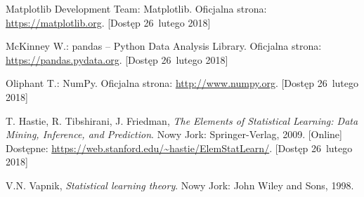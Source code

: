 \documentclass[11pt,a4paper]{article}
\begin{document}
\begin{thebibliography}{9}

        Matplotlib Development Team:
        Matplotlib.
        Oficjalna strona: \url{https://matplotlib.org}.
        [Dostęp 26~lutego 2018]

        McKinney W.:
        pandas -- Python Data Analysis Library.
        Oficjalna strona: \url{https://pandas.pydata.org}.
        [Dostęp 26~lutego 2018]

        Oliphant T.:
        NumPy.
        Oficjalna strona: \url{http://www.numpy.org}.
        [Dostęp 26~lutego 2018]

        T. Hastie,
        R. Tibshirani,
        J. Friedman,
        \emph{The Elements of Statistical Learning: Data Mining, Inference, and Prediction}.
        Nowy Jork: Springer-Verlag,
        2009.
        [Online] \\
        Dostępne: \url{https://web.stanford.edu/~hastie/ElemStatLearn/}.
        [Dostęp 26~lutego 2018]

        V.N. Vapnik,
        \emph{Statistical learning theory}.
        Nowy Jork: John Wiley and Sons,
        1998.

\end{thebibliography}
\end{document}

